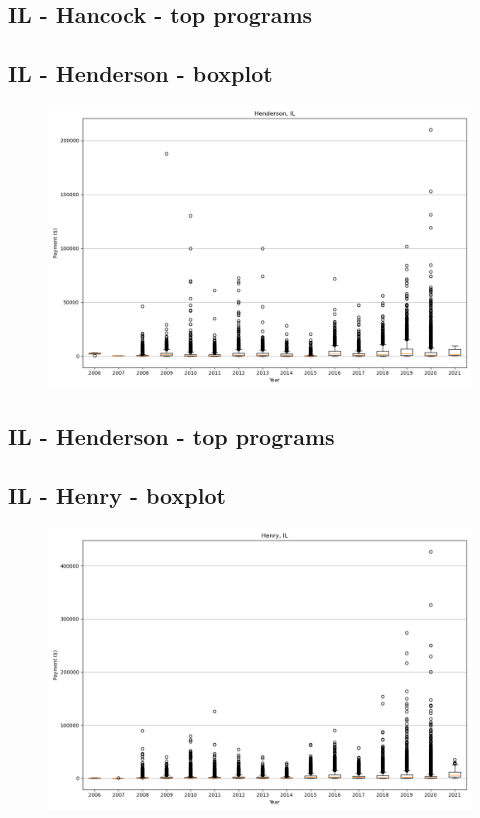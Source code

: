 \subsection*{IL - Hancock - top programs}

\newpage
\subsection*{IL - Henderson - boxplot}
\begin{figure}[h]
\centering
\includegraphics[width=7in]{../output/boxplots/counties/Henderson-IL_boxplot.png}
\end{figure}


\subsection*{IL - Henderson - top programs}

\newpage
\subsection*{IL - Henry - boxplot}
\begin{figure}[h]
\centering
\includegraphics[width=7in]{../output/boxplots/counties/Henry-IL_boxplot.png}
\end{figure}


